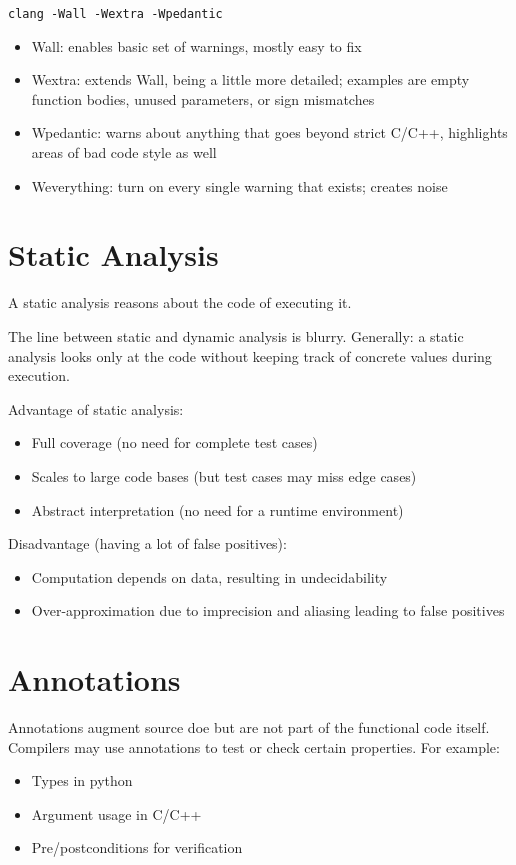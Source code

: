 \documentclass[11pt]{article}
\begin{document}
\verb|clang -Wall -Wextra -Wpedantic|

\begin{itemize}
	\item Wall: enables basic set of warnings, mostly easy to fix
	\item Wextra: extends Wall, being a little more detailed; examples are empty function bodies, unused parameters, or sign mismatches
	\item Wpedantic: warns about anything that goes beyond strict C/C++, highlights areas of bad code style as well
	\item Weverything: turn on every single warning that exists; creates noise
\end{itemize}

\section*{Static Analysis}

A static analysis reasons about the code of executing it. 

The line between static and dynamic analysis is blurry. Generally: a static analysis looks only at the code without keeping track of concrete values during execution. 

Advantage of static analysis: 
\begin{itemize}
	\item Full coverage (no need for complete test cases)
	\item Scales to large code bases (but test cases may miss edge cases)
	\item Abstract interpretation (no need for a runtime environment)
\end{itemize}

Disadvantage (having a lot of false positives): 
\begin{itemize}
	\item Computation depends on data, resulting in undecidability 
	\item Over-approximation due to imprecision and aliasing leading to false positives
\end{itemize}

\section*{Annotations}

Annotations augment source doe but are not part of the functional code itself. Compilers may use annotations to test or check certain properties. For example: 
\begin{itemize}
	\item Types in python
	\item Argument usage in C/C++
	\item Pre/postconditions for verification
\end{itemize}
\end{document}
